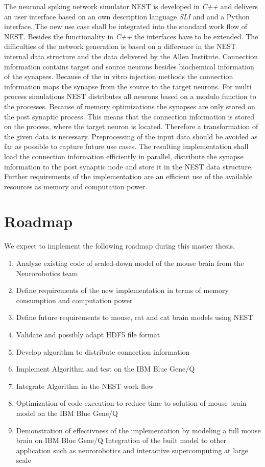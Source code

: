 \documentclass[a4paper]{article}
\begin{document}
The neuronal spiking network simulator NEST is developed in \emph{C++} and delivers
an user interface based on an own description language \emph{SLI} and  and a Python interface.
The new use case shall be integrated into the standard work flow of NEST.
Besides the functionality in \emph{C++} the interfaces have to be extended.
The difficulties of the network generation is based on a difference in 
the NEST internal data structure and the data delivered by the Allen Institute.
Connection information contains target and source neurons besides biochemical
information of the synapses. Because of the in vitro injection methods the
connection information maps the synapse from the source to the target neurons.
For multi process simulations NEST distributes all neurons based on a modulo function 
to the processes. Because of memory optimizations the synapses are only stored on the
post synaptic process. This means that the connection information is stored
on the process, where the target neuron is located. Therefore a transformation of the given data is
necessary. Preprocessing of the input data should be avoided as far as possible to capture
future use cases.
The resulting implementation shall load the connection information efficiently in parallel,
distribute the synapse information to the post synaptic node and store it in
the NEST data structure.
Further requirements of the implementation are an efficient use of the available resources as
memory and computation power. 

\section{Roadmap}
We expect to implement the following roadmap during this master thesis.
\begin{enumerate}
    \item Analyze existing code of scaled-down model of the mouse brain from the Neurorobotics team
    \item Define requirements of the new implementation in terms of memory consumption and computation power
    \item Define future requirements to mouse, rat and cat brain models using NEST
    \item Validate and possibly adapt HDF5 file format
    \item Develop algorithm to distribute connection information
    \item Implement Algorithm and test on the IBM Blue Gene/Q
    \item Integrate Algorithm in the NEST work flow
    \item Optimization of code execution to reduce time to solution of mouse brain model on the IBM Blue Gene/Q
    \item Demonstration of effectivness of the implementation by modeling a full mouse brain on IBM Blue Gene/Q
    \Item Integration of the built model to other application such as neurorobotics and interactive supercomputing at large scale
\end{enumerate}
\end{document}
